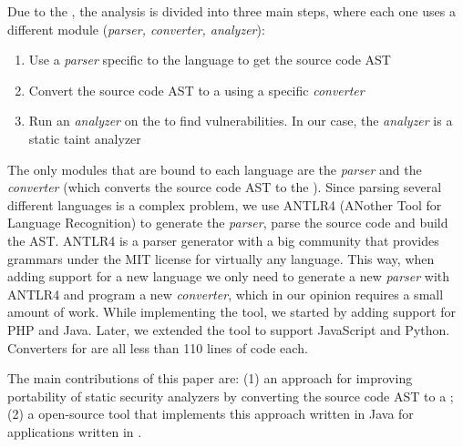 Due to the \astname{}, the analysis is divided into three main steps, where each one uses a different module (\textit{parser, converter, analyzer}):

\begin{enumerate}
    \item Use a \textit{parser} specific to the language to get the source code AST
    \item Convert the source code AST to a \astname{} using a specific \textit{converter}

    \item Run an \textit{analyzer} on the \astname{} to find vulnerabilities. In our case, the \textit{analyzer} is a static taint analyzer
\end{enumerate}

The only modules that are bound to each language are the \textit{parser} and the \textit{converter} (which converts the source code AST to the \astname{}). Since parsing several different languages is a complex problem, we use ANTLR4 (ANother Tool for Language Recognition) to generate the \textit{parser}, parse the source code and build the AST. ANTLR4 is a parser generator with a big community that provides grammars under the MIT license for virtually any language. This way, when adding support for a new language we only need to generate a new \textit{parser} with ANTLR4 and program a new \textit{converter}, which in our opinion requires a small amount of work. While implementing the \toolname{} tool, we started by adding support for PHP and Java. Later, we extended the tool to support JavaScript and Python. Converters for \implangs{} are all less than 110 lines of code each. 

The main contributions of this paper are: (1) an approach for improving portability of static security analyzers by converting the source code AST to a \astname{}; (2) a open-source tool that implements this approach written in Java for applications written in \implangs{}.
